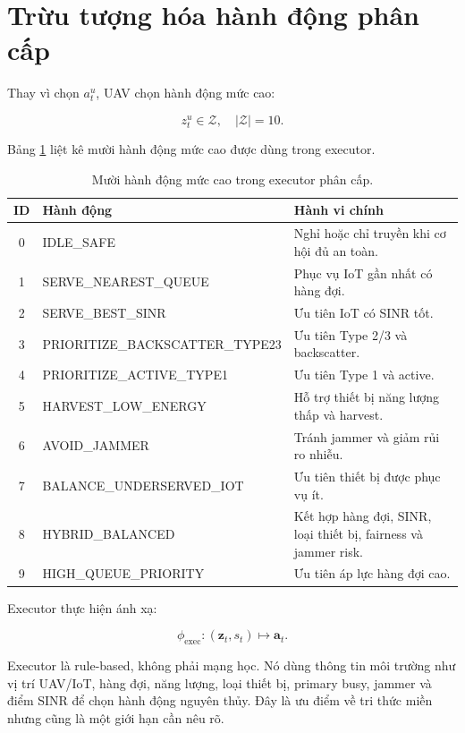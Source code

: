 \section{Trừu tượng hóa hành động phân cấp}

Thay vì chọn \(a^u_t\), UAV chọn hành động mức cao:

\begin{equation}
z^u_t\in\mathcal{Z},\quad |\mathcal{Z}|=10.
\label{eq:high_action}
\end{equation}

Bảng \ref{tab:high_level_actions} liệt kê mười hành động mức cao được dùng trong executor.

\begin{table}[H]
\centering
\caption{Mười hành động mức cao trong executor phân cấp.}
\label{tab:high_level_actions}
\small
\begin{tabularx}{\textwidth}{clX}
\toprule
ID & Hành động & Hành vi chính \\
\midrule
0 & IDLE\_SAFE & Nghỉ hoặc chỉ truyền khi cơ hội đủ an toàn. \\
1 & SERVE\_NEAREST\_QUEUE & Phục vụ IoT gần nhất có hàng đợi. \\
2 & SERVE\_BEST\_SINR & Ưu tiên IoT có SINR tốt. \\
3 & PRIORITIZE\_BACKSCATTER\_TYPE23 & Ưu tiên Type 2/3 và backscatter. \\
4 & PRIORITIZE\_ACTIVE\_TYPE1 & Ưu tiên Type 1 và active. \\
5 & HARVEST\_LOW\_ENERGY & Hỗ trợ thiết bị năng lượng thấp và harvest. \\
6 & AVOID\_JAMMER & Tránh jammer và giảm rủi ro nhiễu. \\
7 & BALANCE\_UNDERSERVED\_IOT & Ưu tiên thiết bị được phục vụ ít. \\
8 & HYBRID\_BALANCED & Kết hợp hàng đợi, SINR, loại thiết bị, fairness và jammer risk. \\
9 & HIGH\_QUEUE\_PRIORITY & Ưu tiên áp lực hàng đợi cao. \\
\bottomrule
\end{tabularx}
\end{table}

Executor thực hiện ánh xạ:

\begin{equation}
\phi_{\mathrm{exec}}:(\mathbf{z}_t,s_t)\mapsto \mathbf{a}_t.
\label{eq:executor_mapping}
\end{equation}

Executor là rule-based, không phải mạng học. Nó dùng thông tin môi trường như vị trí UAV/IoT, hàng đợi, năng lượng, loại thiết bị, primary busy, jammer và điểm SINR để chọn hành động nguyên thủy. Đây là ưu điểm về tri thức miền nhưng cũng là một giới hạn cần nêu rõ.

